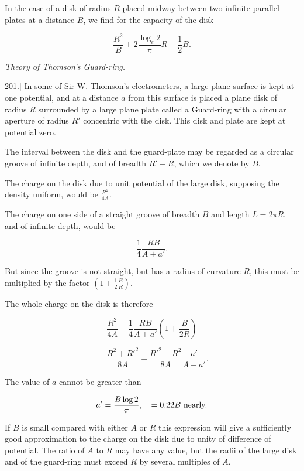 \documentclass[11pt,a4paper]{article}
\begin{document}
In the case of a disk of radius $R$ placed midway between two infinite
parallel plates at a distance $B$, we find for the capacity of the disk

\begin{equation}\tag{38}
\frac{R^2}{B} + 2\frac{\log_e 2}{\pi} R + \frac{1}{2}B.
\end{equation}

\begin{center}
\textit{Theory of Thomson's Guard-ring.}
\end{center}

201.] In some of Sir W. Thomson's electrometers, a large plane surface
is kept at one potential, and at a distance $a$ from this surface is
placed a plane disk of radius $R$ surrounded by a large plane plate
called a Guard-ring with a circular aperture of radius $R'$ concentric
with the disk. This disk and plate are kept at potential zero.

The interval between the disk and the guard-plate may be regarded as a
circular groove of infinite depth, and of breadth $R'-R$, which we
denote by $B$.

The charge on the disk due to unit potential of the large disk,
supposing the density uniform, would be $\frac{R^2}{4A}$.

The charge on one side of a straight groove of breadth $B$ and length
$L=2\pi R$, and of infinite depth, would be

\[
\frac{1}{4}\frac{RB}{A+a'}.
\]

But since the groove is not straight, but has a radius of curvature
$R$, this must be multiplied by the factor
$(1+\frac{1}{2}\frac{B}{R})$.

The whole charge on the disk is therefore

\begin{equation}\tag{39}
\frac{R^2}{4A}+\frac{1}{4}\frac{RB}{A+a'}\left(1+\frac{B}{2R}\right)
\end{equation}

\begin{equation}\tag{40}
=\frac{R^2+R'^2}{8A}-\frac{R'^2-R^2}{8A}\frac{a'}{A+a'}.
\end{equation}

The value of $a$ cannot be greater than

\[
a'=\frac{B\log 2}{\pi},\quad =0.22B\hbox{ nearly.}
\]

If $B$ is small compared with either $A$ or $R$ this expression will
give a sufficiently good approximation to the charge on the disk due
to unity of difference of potential. The ratio of $A$ to $R$ may have
any value, but the radii of the large disk and of the guard-ring must
exceed $R$ by several multiples of $A$.
\end{document}
